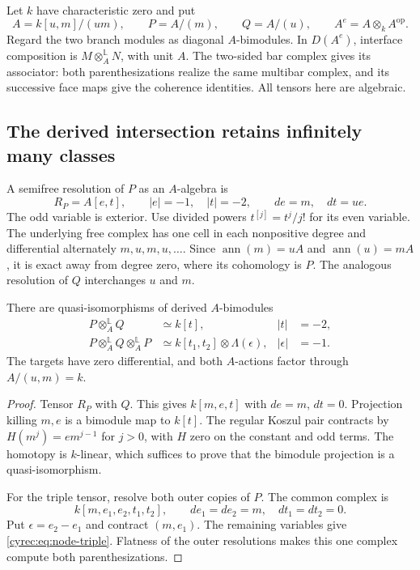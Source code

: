 Let $k$ have characteristic zero and put
\[
 A=k[u,m]/(um),\qquad P=A/(m),\qquad Q=A/(u),
 \qquad A^e=A\otimes_kA^{\mathrm{op}}.
\]
Regard the two branch modules as diagonal $A$-bimodules.
In $D(A^e)$, interface composition is
$M\otimes_A^{\mathbb L}N$, with unit $A$.
The two-sided bar complex gives its associator: both
parenthesizations realize the same multibar complex, and its
successive face maps give the coherence identities.
All tensors here are algebraic.

\subsection{The derived intersection retains infinitely many classes}

A semifree resolution of $P$ as an $A$-algebra is
\begin{equation}\label{cyrec:eq:node-resolution}
 R_P=A[e,t],\qquad |e|=-1,\quad |t|=-2,
 \qquad de=m,\quad dt=ue.
\end{equation}
The odd variable is exterior. Use divided powers
$t^{[j]}=t^j/j!$ for its even variable.
The underlying free complex has one cell in each nonpositive
degree and differential alternately $m,u,m,u,\ldots$.
Since $\operatorname{ann}(m)=uA$ and
$\operatorname{ann}(u)=mA$, it is exact away from degree zero,
where its cohomology is $P$.
The analogous resolution of $Q$ interchanges $u$ and $m$.

\begin{proposition}\label{cyrec:prop:node-composition}
There are quasi-isomorphisms of derived $A$-bimodules
\begin{align}
 P\otimes_A^{\mathbb L}Q&\simeq k[t],
               &|t|&=-2,\label{cyrec:eq:node-binary}\\
 P\otimes_A^{\mathbb L}Q\otimes_A^{\mathbb L}P
      &\simeq k[t_1,t_2]\otimes\Lambda(\epsilon),
               &|\epsilon|&=-1.
 \label{cyrec:eq:node-triple}
\end{align}
The targets have zero differential, and both $A$-actions factor
through $A/(u,m)=k$.
\end{proposition}

\begin{proof}
Tensor $R_P$ with $Q$. This gives $k[m,e,t]$ with $de=m$,
$dt=0$. Projection killing $m,e$ is a bimodule map to $k[t]$.
The regular Koszul pair contracts by
$H(m^j)=em^{j-1}$ for $j>0$, with $H$ zero on the constant
and odd terms. The homotopy is $k$-linear, which suffices to
prove that the bimodule projection is a quasi-isomorphism.

For the triple tensor, resolve both outer copies of $P$.
The common complex is
\[
 k[m,e_1,e_2,t_1,t_2],\qquad
 de_1=de_2=m,\quad dt_1=dt_2=0.
\]
Put $\epsilon=e_2-e_1$ and contract $(m,e_1)$.
The remaining variables give \eqref{cyrec:eq:node-triple}.
Flatness of the outer resolutions makes this one complex compute
both parenthesizations.
\end{proof}

